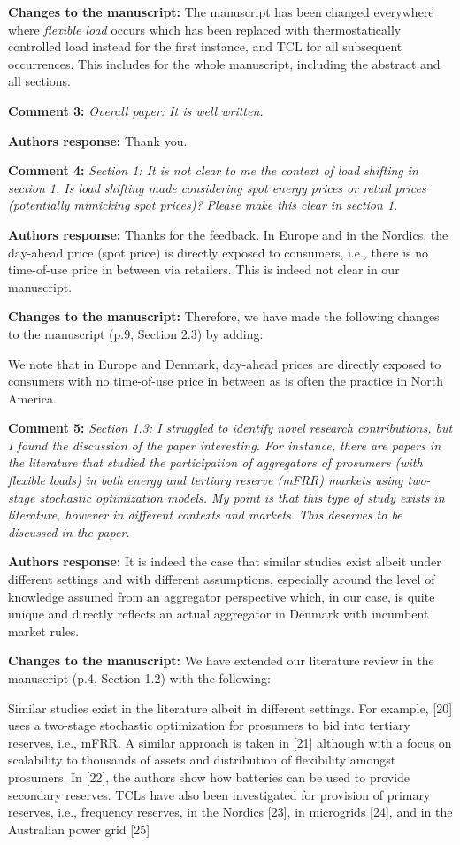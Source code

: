 \documentclass[10pt]{article}
\newcounter{models}
\newcommand{\nt}[1]{\textcolor{newtextcolor}{#1}}
\newcommand{\auth}{\textbf{Authors response: }}
\newcommand{\changes}{\textbf{Changes to the manuscript: }}
\begin{document}
\changes The manuscript has been changed everywhere where \textit{flexible load} occurs which has been replaced with \nt{thermostatically controlled load} instead for the first instance, and \nt{TCL} for all subsequent occurrences. This includes for the whole manuscript, including the abstract and all sections.

\textbf{Comment 3:} \textit{Overall paper: It is well written.}

\auth Thank you.

\textbf{Comment 4:} \textit{Section 1: It is not clear to me the context of load shifting in section 1. Is load shifting made considering spot energy prices or retail prices (potentially mimicking spot prices)? Please make this clear in section 1.}

\auth Thanks for the feedback. In Europe and in the Nordics, the day-ahead price (spot price) is directly exposed to consumers, i.e., there is no time-of-use price in between via retailers. This is indeed not clear in our manuscript.

\changes Therefore, we have made the following changes to the manuscript (p.9, Section 2.3) by adding:

\nt{We note that in Europe and Denmark, day-ahead prices are directly exposed to consumers with no time-of-use price in between as is often the practice in North America.}

\textbf{Comment 5:} \textit{Section 1.3: I struggled to identify novel research contributions, but I found the discussion of the paper interesting. For instance, there are papers in the literature that studied the participation of aggregators of prosumers (with flexible loads) in both energy and tertiary reserve (mFRR) markets using two-stage stochastic optimization models. My point is that this type of study exists in literature, however in different contexts and markets. This deserves to be discussed in the paper.}

\auth It is indeed the case that similar studies exist albeit under different settings and with different assumptions, especially around the level of knowledge assumed from an aggregator perspective which, in our case, is quite unique and directly reflects an actual aggregator in Denmark with incumbent market rules.

\changes We have extended our literature review in the manuscript (p.4, Section 1.2) with the following:

\nt{Similar studies exist in the literature albeit in different settings. For example, [20] uses a two-stage stochastic optimization for prosumers to bid into tertiary reserves, i.e., mFRR. A similar approach is taken in [21] although with a focus on scalability to thousands of assets and distribution of flexibility amongst prosumers. In [22], the authors show how batteries can be used to provide secondary reserves. TCLs have also been investigated for provision of primary reserves, i.e., frequency reserves, in the Nordics [23], in microgrids [24], and in the Australian power grid [25]}
\end{document}

